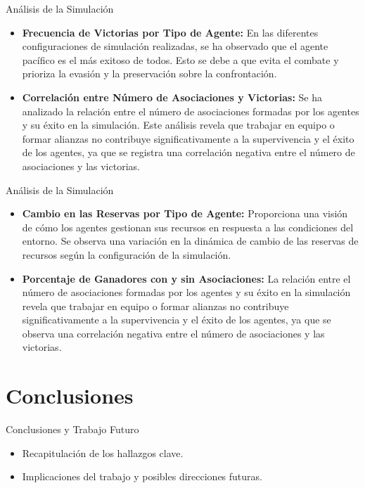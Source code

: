 \documentclass{beamer}
\begin{document}
\begin{frame}{Análisis de la Simulación}
  \begin{itemize}
    \item \textbf{Frecuencia de Victorias por Tipo de Agente:} En las diferentes configuraciones de simulación realizadas, se ha observado que el agente pacífico es el más exitoso de todos. Esto se debe a que evita el combate y prioriza la evasión y la preservación sobre la confrontación.
    \item \textbf{Correlación entre Número de Asociaciones y Victorias:} Se ha analizado la relación entre el número de asociaciones formadas por los agentes y su éxito en la simulación. Este análisis revela que trabajar en equipo o formar alianzas no contribuye significativamente a la supervivencia y el éxito de los agentes, ya que se registra una correlación negativa entre el número de asociaciones y las victorias.
  \end{itemize}
\end{frame}

\begin{frame}{Análisis de la Simulación}
  \begin{itemize}
    \item \textbf{Cambio en las Reservas por Tipo de Agente:} Proporciona una visión de cómo los agentes gestionan sus recursos en respuesta a las condiciones del entorno. Se observa una variación en la dinámica de cambio de las reservas de recursos según la configuración de la simulación.
    \item \textbf{Porcentaje de Ganadores con y sin Asociaciones:} La relación entre el número de asociaciones formadas por los agentes y su éxito en la simulación revela que trabajar en equipo o formar alianzas no contribuye significativamente a la supervivencia y el éxito de los agentes, ya que se observa una correlación negativa entre el número de asociaciones y las victorias.
  \end{itemize}
\end{frame}

\section{Conclusiones}
\begin{frame}{Conclusiones y Trabajo Futuro}
  \begin{itemize}
    \item Recapitulación de los hallazgos clave.
    \item Implicaciones del trabajo y posibles direcciones futuras.
  \end{itemize}
\end{frame}
\end{document}
